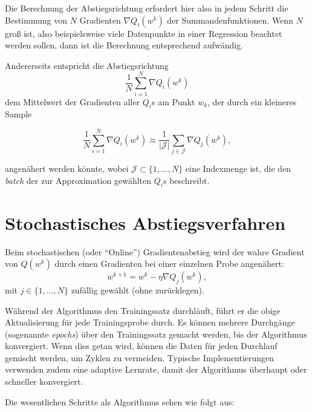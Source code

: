 \documentclass[
]{book}
\theoremstyle{definition}
\theoremstyle{definition}
\theoremstyle{definition}
\theoremstyle{definition}
\theoremstyle{remark}
\begin{document}
Die Berechnung der Abstiegsrichtung erfordert hier also in jedem Schritt die Bestimmung von \(N\) Gradienten \(\nabla Q_i(w^k)\) der Summandenfunktionen. Wenn \(N\) groß ist, also beispielsweise viele Datenpunkte in einer Regression beachtet werden sollen, dann ist die Berechnung entsprechend aufwändig.

Andererseits entspricht die Abstiegsrichtung
\begin{equation*}
\frac{1}{N} \sum_{i=1}^N \nabla Q_i(w^k)
\end{equation*}
dem Mittelwert der Gradienten aller \(Q_i\)s am Punkt \(w_k\), der durch ein kleineres Sample

\begin{equation*}
\frac{1}{N} \sum_{i=1}^N \nabla Q_i(w^k) \approx \frac{1}{|\mathcal J|} \sum_{j\in \mathcal J} \nabla Q_j(w^k),
\end{equation*}

angenähert werden könnte, wobei \(\mathcal J \subset \{1, \dotsc, N\}\) eine Indexmenge ist, die den \emph{batch} der zur Approximation gewählten \(Q_i\)s beschreibt.

\hypertarget{iterative_method}{%
\section{Stochastisches Abstiegsverfahren}\label{iterative_method}}

Beim stochastischen (oder ``Online'') Gradientenabstieg wird der wahre Gradient von \(Q(w^k)\) durch einen Gradienten bei einer einzelnen Probe angenähert:
\begin{equation*}
w^{k+1} = w^k-\eta \nabla Q_j(w^k),
\end{equation*}
mit \(j\in \{1,\dotsc, N\}\) zufällig gewählt (ohne zurücklegen).

Während der Algorithmus den Trainingssatz durchläuft, führt er die obige Aktualisierung für jede Trainingsprobe durch. Es können mehrere Durchgänge (sogenannte \emph{epochs}) über den Trainingssatz gemacht werden, bis der Algorithmus konvergiert. Wenn dies getan wird, können die Daten für jeden Durchlauf gemischt werden, um Zyklen zu vermeiden. Typische Implementierungen verwenden zudem eine adaptive Lernrate, damit der Algorithmus überhaupt oder schneller konvergiert.

Die wesentlichen Schritte als Algorithmus sehen wie folgt aus:
\end{document}
